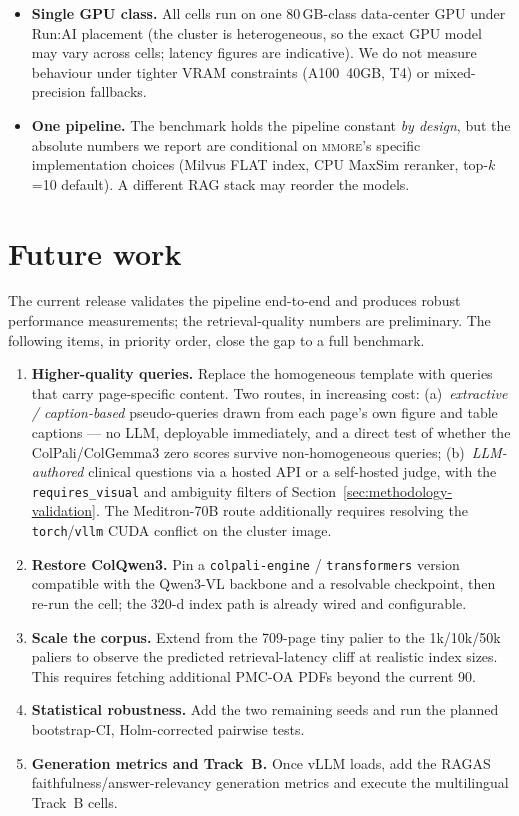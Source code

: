 \documentclass[10pt,a4paper]{article}
\begin{document}
\begin{itemize}
  \item \textbf{Single GPU class.} All cells run on one 80\,GB-class
    data-center GPU under Run:AI placement (the cluster is heterogeneous, so
    the exact GPU model may vary across cells; latency figures are
    indicative). We do not measure behaviour under tighter VRAM constraints
    (A100~40GB, T4) or mixed-precision fallbacks.
  \item \textbf{One pipeline.} The benchmark holds the pipeline constant
    \emph{by design}, but the absolute numbers we report are conditional on
    \textsc{mmore}'s specific implementation choices (Milvus \textsc{FLAT}
    index, CPU MaxSim reranker, top-$k$=10 default). A different RAG stack
    may reorder the models.
\end{itemize}

\section{Future work}
\label{sec:future-work}

The current release validates the pipeline end-to-end and produces robust
performance measurements; the retrieval-quality numbers are preliminary. The
following items, in priority order, close the gap to a full benchmark.

\begin{enumerate}
  \item \textbf{Higher-quality queries.} Replace the homogeneous template
    with queries that carry page-specific content. Two routes, in increasing
    cost: (a)~\emph{extractive / caption-based} pseudo-queries drawn from each
    page's own figure and table captions --- no LLM, deployable immediately,
    and a direct test of whether the ColPali/ColGemma3 zero scores survive
    non-homogeneous queries; (b)~\emph{LLM-authored} clinical questions via a
    hosted API or a self-hosted judge, with the \texttt{requires\_visual} and
    ambiguity filters of Section~\ref{sec:methodology-validation}. The
    Meditron-70B route additionally requires resolving the
    \texttt{torch}/\texttt{vllm} CUDA conflict on the cluster image.
  \item \textbf{Restore ColQwen3.} Pin a \texttt{colpali-engine} /
    \texttt{transformers} version compatible with the Qwen3-VL backbone and a
    resolvable checkpoint, then re-run the cell; the 320-d index path is
    already wired and configurable.
  \item \textbf{Scale the corpus.} Extend from the 709-page tiny palier to the
    1k/10k/50k paliers to observe the predicted retrieval-latency cliff at
    realistic index sizes. This requires fetching additional PMC-OA PDFs
    beyond the current 90.
  \item \textbf{Statistical robustness.} Add the two remaining seeds and run
    the planned bootstrap-CI, Holm-corrected pairwise tests.
  \item \textbf{Generation metrics and Track~B.} Once vLLM loads, add the
    RAGAS faithfulness/answer-relevancy generation metrics and execute the
    multilingual Track~B cells.
\end{enumerate}
\end{document}

